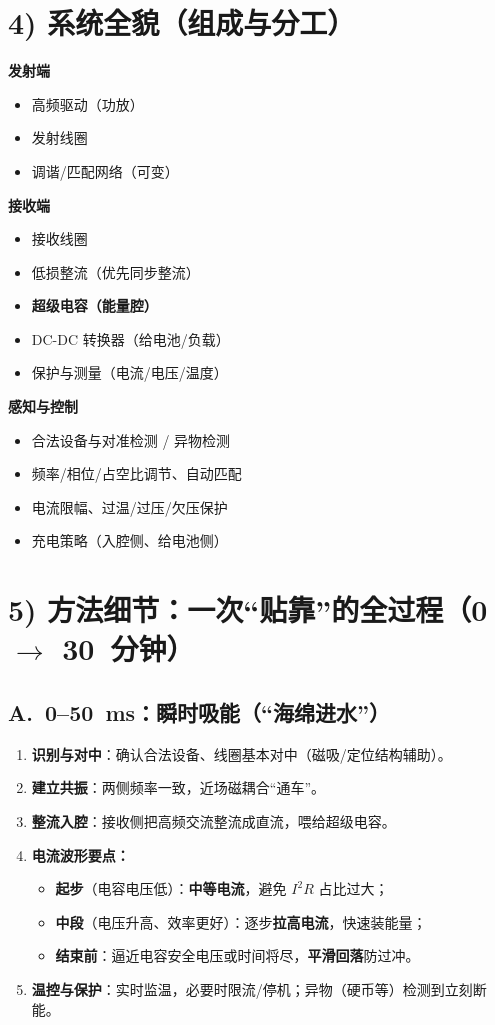 \documentclass[11pt]{ctexart}
\begin{document}
\section{4) 系统全貌（组成与分工）}
\textbf{发射端}
\begin{itemize}
  \item 高频驱动（功放）
  \item 发射线圈
  \item 调谐/匹配网络（可变）
\end{itemize}
\textbf{接收端}
\begin{itemize}
  \item 接收线圈
  \item 低损整流（优先同步整流）
  \item \textbf{超级电容（能量腔）}
  \item DC-DC 转换器（给电池/负载）
  \item 保护与测量（电流/电压/温度）
\end{itemize}
\textbf{感知与控制}
\begin{itemize}
  \item 合法设备与对准检测 / 异物检测
  \item 频率/相位/占空比调节、自动匹配
  \item 电流限幅、过温/过压/欠压保护
  \item 充电策略（入腔侧、给电池侧）
\end{itemize}

\section{5) 方法细节：一次“贴靠”的全过程（0 \texorpdfstring{$\to$}{->} 30~分钟）}
\subsection*{A.~0--50~ms：瞬时吸能（“海绵进水”）}
\begin{enumerate}
  \item \textbf{识别与对中}：确认合法设备、线圈基本对中（磁吸/定位结构辅助）。
  \item \textbf{建立共振}：两侧频率一致，近场磁耦合“通车”。
  \item \textbf{整流入腔}：接收侧把高频交流整流成直流，喂给超级电容。
  \item \textbf{电流波形要点：}
    \begin{itemize}
      \item \textbf{起步}（电容电压低）：\textbf{中等电流}，避免 $I^2R$ 占比过大；
      \item \textbf{中段}（电压升高、效率更好）：逐步\textbf{拉高电流}，快速装能量；
      \item \textbf{结束前}：逼近电容安全电压或时间将尽，\textbf{平滑回落}防过冲。
    \end{itemize}
  \item \textbf{温控与保护}：实时监温，必要时限流/停机；异物（硬币等）检测到立刻断能。
\end{enumerate}
\end{document}
